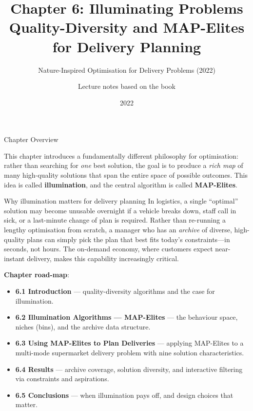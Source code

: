 \documentclass[aspectratio=169,10pt]{beamer}
\title[Chapter 6 — Illuminating Problems]{%
  \textbf{Chapter 6: Illuminating Problems}\\
  \large Quality-Diversity and MAP-Elites for Delivery Planning}
\subtitle{Nature-Inspired Optimisation for Delivery Problems (2022)}
\author{Lecture notes based on the book}
\date{2022}
\begin{document}

\begin{frame}
  \titlepage
\end{frame}

\begin{frame}[allowframebreaks]{Chapter Overview}

This chapter introduces a fundamentally different philosophy for
optimisation: rather than searching for \emph{one} best solution,
the goal is to produce a \emph{rich map} of many high-quality
solutions that span the entire space of possible outcomes.
This idea is called \textbf{illumination}, and the central algorithm
is called \textbf{MAP-Elites}.

\medskip
\begin{block}{Why illumination matters for delivery planning}
In logistics, a single ``optimal'' solution may become unusable
overnight if a vehicle breaks down, staff call in sick, or a last-minute
change of plan is required.
Rather than re-running a lengthy optimisation from scratch, a manager
who has an \emph{archive} of diverse, high-quality plans can simply
pick the plan that best fits today's constraints---in seconds, not hours.
The on-demand economy, where customers expect near-instant delivery,
makes this capability increasingly critical.
\end{block}

\medskip
\textbf{Chapter road-map}:
\begin{itemize}
  \item \textbf{6.1 Introduction} --- quality-diversity algorithms and
        the case for illumination.
  \item \textbf{6.2 Illumination Algorithms --- MAP-Elites} --- the
        behaviour space, niches (bins), and the archive data structure.
  \item \textbf{6.3 Using MAP-Elites to Plan Deliveries} --- applying
        MAP-Elites to a multi-mode supermarket delivery problem with
        nine solution characteristics.
  \item \textbf{6.4 Results} --- archive coverage, solution diversity,
        and interactive filtering via constraints and aspirations.
  \item \textbf{6.5 Conclusions} --- when illumination pays off, and
        design choices that matter.
\end{itemize}

\end{frame}
\end{document}
